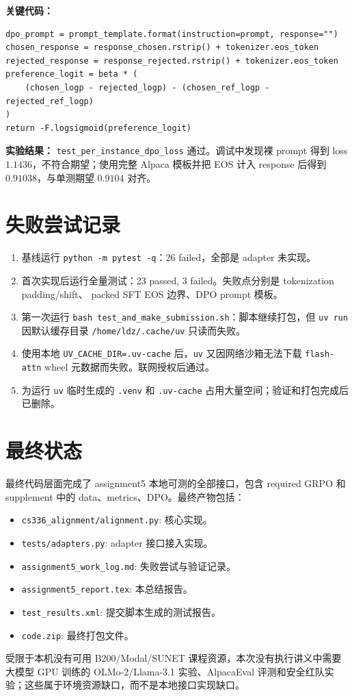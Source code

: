 \documentclass[UTF8]{ctexart}
\begin{document}
\textbf{关键代码：}
\begin{verbatim}
dpo_prompt = prompt_template.format(instruction=prompt, response="")
chosen_response = response_chosen.rstrip() + tokenizer.eos_token
rejected_response = response_rejected.rstrip() + tokenizer.eos_token
preference_logit = beta * (
    (chosen_logp - rejected_logp) - (chosen_ref_logp - rejected_ref_logp)
)
return -F.logsigmoid(preference_logit)
\end{verbatim}

\textbf{实验结果：} \texttt{test\_per\_instance\_dpo\_loss} 通过。调试中发现裸 prompt 得到
loss \(1.1436\)，不符合期望；使用完整 Alpaca 模板并把 EOS 计入 response 后得到
\(0.91038\)，与单测期望 \(0.9104\) 对齐。

\section{失败尝试记录}

\begin{enumerate}[label=\arabic*.]
\item 基线运行 \texttt{python -m pytest -q}：26 failed，全部是 adapter 未实现。
\item 首次实现后运行全量测试：23 passed, 3 failed。失败点分别是 tokenization padding/shift、
packed SFT EOS 边界、DPO prompt 模板。
\item 第一次运行 \texttt{bash test\_and\_make\_submission.sh}：脚本继续打包，但 \texttt{uv run}
因默认缓存目录 \texttt{/home/ldz/.cache/uv} 只读而失败。
\item 使用本地 \texttt{UV\_CACHE\_DIR=.uv-cache} 后，\texttt{uv} 又因网络沙箱无法下载
\texttt{flash-attn} wheel 元数据而失败。联网授权后通过。
\item 为运行 \texttt{uv} 临时生成的 \texttt{.venv} 和 \texttt{.uv-cache} 占用大量空间；验证和打包完成后已删除。
\end{enumerate}

\section{最终状态}

最终代码层面完成了 assignment5 本地可测的全部接口，包含 required GRPO 和 supplement
中的 data、metrics、DPO。最终产物包括：

\begin{itemize}
\item \texttt{cs336\_alignment/alignment.py}: 核心实现。
\item \texttt{tests/adapters.py}: adapter 接口接入实现。
\item \texttt{assignment5\_work\_log.md}: 失败尝试与验证记录。
\item \texttt{assignment5\_report.tex}: 本总结报告。
\item \texttt{test\_results.xml}: 提交脚本生成的测试报告。
\item \texttt{code.zip}: 最终打包文件。
\end{itemize}

受限于本机没有可用 B200/Modal/SUNET 课程资源，本次没有执行讲义中需要大模型 GPU 训练的
OLMo-2/Llama-3.1 实验、AlpacaEval 评测和安全红队实验；这些属于环境资源缺口，而不是本地接口实现缺口。
\end{document}

